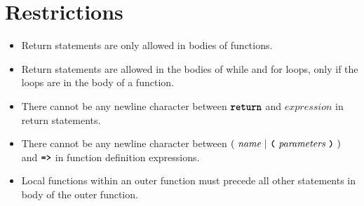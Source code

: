 \section*{Restrictions}

\begin{itemize}
\item Return statements are only allowed in bodies of functions.
\item Return statements are allowed in the bodies of while and for loops, only if the loops are in the body of a function.
\item There cannot be any newline character between
$\textbf{\texttt{return}}$ and $\textit{expression}$ in return statements.
\item There cannot be any newline character between
  $(\ \textit{name}\ | \ \textbf{\texttt{(}}\ \textit{parameters}\ \textbf{\texttt{)}}\ )$
                                               and
$\texttt{\textbf{=>}}$ in function definition expressions.
\item Local functions within an outer function
  must precede all other statements in body of the outer function.
\end{itemize}

